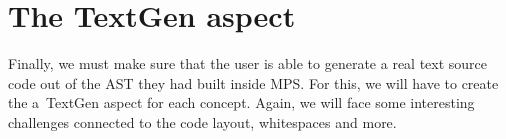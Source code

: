 \section{The TextGen aspect}
Finally, we must make sure that the user is able to generate a real text source code out of the AST they had built inside MPS.
For this, we will have to create the a~TextGen aspect for each concept.
Again, we will face some interesting challenges connected to the code layout, whitespaces and more.
